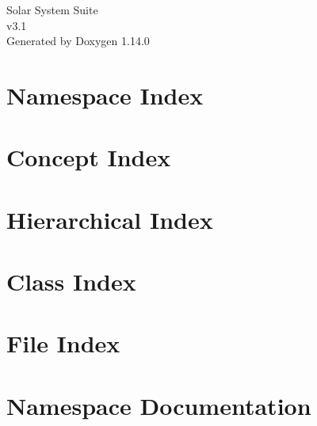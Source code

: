 \documentclass[twoside]{book}
\newcommand{\+}{\discretionary{\mbox{\scriptsize$\hookleftarrow$}}{}{}}
\newcommand{\clearemptydoublepage}{%
    \newpage{\pagestyle{empty}\cleardoublepage}%
  }
\begin{document}
  \raggedbottom
    \hypersetup{pageanchor=false,
                bookmarksnumbered=true,
                pdfencoding=unicode
               }
  \begin{titlepage}
  \vspace*{7cm}
  \begin{center}%
  {\Large Solar System Suite}\\
  [1ex]\large v3.\+1 \\
  \vspace*{1cm}
  {\large Generated by Doxygen 1.14.0}\\
  \end{center}
  \end{titlepage}
  \clearemptydoublepage
  \tableofcontents
  \clearemptydoublepage
  \hypersetup{pageanchor=true}
\chapter{Namespace Index}

\chapter{Concept Index}

\chapter{Hierarchical Index}

\chapter{Class Index}

\chapter{File Index}

\chapter{Namespace Documentation}














\end{document}
